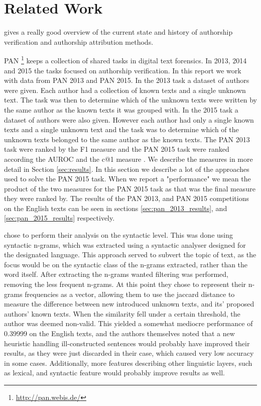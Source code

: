 \section{Related Work} \label{sec:related_work}
\cite{stamatos2009} gives a really good overview of the current state and
history of authorship verification and authorship attribution methods.

PAN \footnote{\url{http://pan.webis.de/}} keeps a collection of shared tasks in
digital text forensics. In 2013, 2014 and 2015 the tasks focused on authorship
verification. In this report we work with data from PAN 2013 and PAN 2015. In
the 2013 task a dataset of authors were given. Each author had a collection of
known texts and a single unknown text. The task was then to determine which of
the unknown texts were written by the same author as the known texts it was
grouped with. In the 2015 task a dataset of authors were also given. However
each author had only a single known texts and a single unknown text and the task
was to determine which of the unknown texts belonged to the same author as the
known texts. The PAN 2013 task were ranked by the F1 measure and the PAN 2015
task were ranked according the \gls{AUROC} and the c@1 measure \cite{penas2011}.
We describe the measures in more detail in Section \ref{sec:results}. In
this section we describe a lot of the approaches used to solve the PAN 2015
task. When we report a "performance" we mean the product of the two measures
for the PAN 2015 task as that was the final measure they were ranked by. The
results of the PAN 2013, and PAN 2015 competitions on the English texts can be
seen in sections \ref{sec:pan_2013_results}, and \ref{sec:pan_2015_results}
respectively.

\cite{juanpablo2015} chose to perform their analysis on the syntactic level.
This was done using syntactic n-grams, which was extracted using a syntactic
analyser designed for the designated language. This approach served to subvert
the topic of text, as the focus would be on the syntactic class of the n-grams
extracted, rather than the word itself. After extracting the n-grams wanted
filtering was performed, removing the less frequent n-grams. At this point they
chose to represent their n-grams frequencies as a vector, allowing them to use
the jaccard distance to measure the difference between new introduced unknown
texts, and its' proposed authors' known texts. When the similarity fell under
a certain threshold, the author was deemed non-valid. This yielded a somewhat
mediocre performance of 0.39999 on the English texts, and the authors themselves
noted that a new heuristic handling ill-constructed sentences would probably
have improved their results, as they were just discarded in their case, which
caused very low accuracy in some cases. Additionally, more features describing
other linguistic layers, such as lexical, and syntactic feature would probably
improve results as well.

